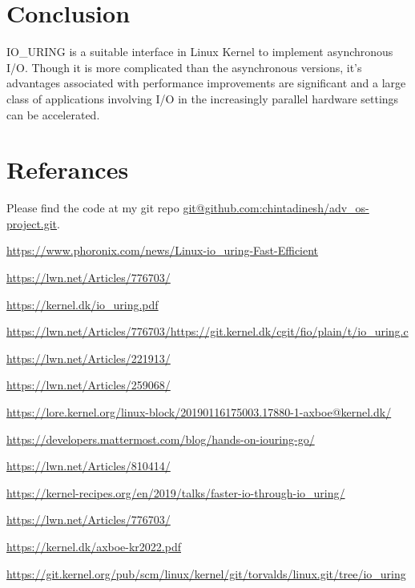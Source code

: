 \documentclass{article}
\begin{document}
\section{Conclusion}
IO\_URING is a suitable interface in Linux Kernel to implement asynchronous I/O. Though it is more complicated than the 
asynchronous versions, it’s advantages associated with performance improvements are significant and a large class of applications 
involving I/O in the increasingly parallel hardware settings can be accelerated.

\section{Referances}



Please find the code at my git repo \href{git@github.com:chintadinesh/adv\_os-project.git}{git@github.com:chintadinesh/adv\_os-project.git}.

\href{https://www.phoronix.com/news/Linux-io\_uring-Fast-Efficient}{https://www.phoronix.com/news/Linux-io\_uring-Fast-Efficient}

\href{https://lwn.net/Articles/776703/}{https://lwn.net/Articles/776703/}

\href{https://kernel.dk/io\_uring.pdf}{https://kernel.dk/io\_uring.pdf}

\href{https://lwn.net/Articles/776703/https://git.kernel.dk/cgit/fio/plain/t/io\_uring.c}{https://lwn.net/Articles/776703/https://git.kernel.dk/cgit/fio/plain/t/io\_uring.c}

\href{https://lwn.net/Articles/221913/}{https://lwn.net/Articles/221913/}

\href{https://lwn.net/Articles/259068/}{https://lwn.net/Articles/259068/}

\href{https://lore.kernel.org/linux-block/20190116175003.17880-1-axboe@kernel.dk/}{https://lore.kernel.org/linux-block/20190116175003.17880-1-axboe@kernel.dk/}

\href{https://developers.mattermost.com/blog/hands-on-iouring-go/}{https://developers.mattermost.com/blog/hands-on-iouring-go/}

\href{https://lwn.net/Articles/810414/}{https://lwn.net/Articles/810414/}

\href{https://kernel-recipes.org/en/2019/talks/faster-io-through-io\_uring/}{https://kernel-recipes.org/en/2019/talks/faster-io-through-io\_uring/}

\href{https://lwn.net/Articles/776703/}{https://lwn.net/Articles/776703/}

\href{https://kernel.dk/axboe-kr2022.pdf}{https://kernel.dk/axboe-kr2022.pdf}

\href{https://git.kernel.org/pub/scm/linux/kernel/git/torvalds/linux.git/tree/io\_uring}{https://git.kernel.org/pub/scm/linux/kernel/git/torvalds/linux.git/tree/io\_uring}
\end{document}
